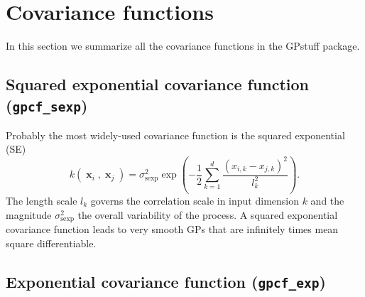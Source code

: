 \documentclass[twoside,11pt]{article}
\DeclareMathOperator{\x}{\mathbf{x}}
\newcommand{\code}[1]{{\normalfont\texttt{#1}}}
\begin{document}

\section{Covariance functions}\label{covariance_functions}

In this section we summarize all the covariance functions in the
GPstuff package.

\subsection*{Squared exponential covariance function (\code{gpcf\_sexp})}

Probably the most widely-used covariance function is the squared
exponential (SE) 
%
\begin{equation}\label{sexp_ARD}
k(\x_i,\x_j)=\sigma_{\textrm{sexp}}^2\exp\left(-\frac{1}{2}\sum_{k=1}^d
  \frac{(x_{i,k}-x_{j,k})^2}{l_k^2} \right).
\end{equation}
%
The length scale $l_k$ governs the correlation scale in input
dimension $k$ and the magnitude $\sigma_{\mathrm{sexp}}^2$ the overall
variability of the process. A squared exponential covariance function
leads to very smooth GPs that are infinitely times mean square
differentiable.

\subsection*{Exponential covariance function (\code{gpcf\_exp})}
\end{document}
